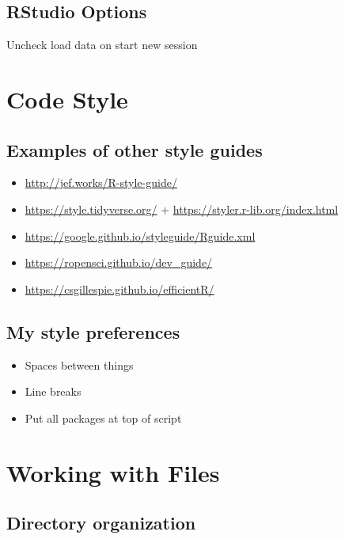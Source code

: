 \documentclass[]{book}
\providecommand{\tightlist}{%
  \setlength{\itemsep}{0pt}\setlength{\parskip}{0pt}}
\begin{document}
\hypertarget{rstudio-options}{%
\subsection{RStudio Options}\label{rstudio-options}}

Uncheck load data on start new session

\hypertarget{code-style}{%
\section{Code Style}\label{code-style}}

\hypertarget{examples-of-other-style-guides}{%
\subsection{Examples of other style guides}\label{examples-of-other-style-guides}}

\begin{itemize}
\tightlist
\item
  \url{http://jef.works/R-style-guide/}
\item
  \url{https://style.tidyverse.org/} + \url{https://styler.r-lib.org/index.html}
\item
  \url{https://google.github.io/styleguide/Rguide.xml}
\item
  \url{https://ropensci.github.io/dev_guide/}
\item
  \url{https://csgillespie.github.io/efficientR/}
\end{itemize}

\hypertarget{my-style-preferences}{%
\subsection{My style preferences}\label{my-style-preferences}}

\begin{itemize}
\tightlist
\item
  Spaces between things
\item
  Line breaks
\item
  Put all packages at top of script
\end{itemize}

\hypertarget{working-with-files}{%
\section{Working with Files}\label{working-with-files}}

\hypertarget{directory-organization}{%
\subsection{Directory organization}\label{directory-organization}}
\end{document}
